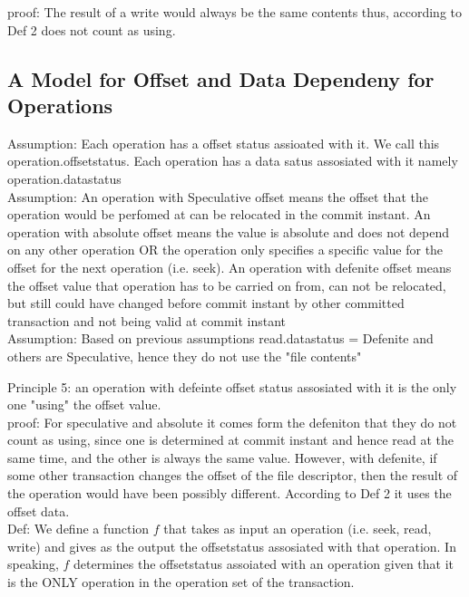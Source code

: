 \documentclass[a4paper, 11pt]{article}
\begin{document}
proof: The result of a write would always be the same contents thus, according to Def 2 does not count as using.\\

\subsection{A Model for Offset and Data Dependeny for Operations}

Assumption: Each operation has a offset status assioated with it. We call this operation.offsetstatus. Each operation has a data satus assosiated with it namely operation.datastatus\\

Assumption:  An operation with Speculative offset means the offset that the operation would be perfomed at can be relocated in the commit instant. An operation with absolute offset means the value is absolute and does not depend on any other operation OR the operation only specifies a specific value for the offset for the next operation (i.e. seek). An operation with defenite offset means the offset value that operation has to be carried on from, can not be relocated, but still could have changed before commit instant by other committed transaction and not being valid at commit instant\\

Assumption: Based on previous assumptions read.datastatus = Defenite and others are Speculative, hence they do not use the "file contents"

Principle 5: an operation with defeinte offset status assosiated with it is the only one "using" the offset value.\\

proof: For speculative and absolute it comes form the defeniton that they do not count as using, since one is determined at commit instant and hence read at the same time, and the other is always the same value. However, with defenite, if some other transaction changes the offset of the file descriptor, then the result of the operation would have been possibly different. According to Def 2 it uses the offset data.\\ 




Def: We define a function $f$ that takes as input an operation (i.e. seek, read, write) and gives as the output the offsetstatus assosiated with that operation. In speaking, $f$ determines the offsetstatus assoiated with an operation given that it is the ONLY operation in the operation set of the transaction. \\
\end{document}
